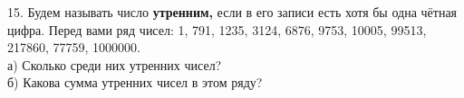 15. Будем называть число {\bf утренним,} если в его записи есть хотя бы одна чётная цифра. Перед вами ряд чисел: 1, 791, 1235, 3124, 6876, 9753, 10005, 99513, 217860, 77759, 1000000.\\
а) Сколько среди них утренних чисел?\\
б) Какова сумма утренних чисел в этом ряду?\\
